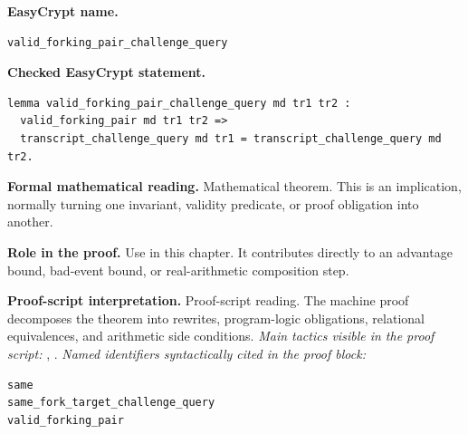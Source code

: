 \begin{formaltheorem}
\noindent\textbf{EasyCrypt name.}
\begin{lstlisting}[language=EasyCrypt,basicstyle=\ttfamily\scriptsize]
valid_forking_pair_challenge_query
\end{lstlisting}
\noindent\textbf{Checked EasyCrypt statement.}
\begin{lstlisting}[language=EasyCrypt,basicstyle=\ttfamily\scriptsize]
lemma valid_forking_pair_challenge_query md tr1 tr2 :
  valid_forking_pair md tr1 tr2 =>
  transcript_challenge_query md tr1 = transcript_challenge_query md tr2.
\end{lstlisting}
\noindent\textbf{Formal mathematical reading.}
Mathematical theorem. This is an implication, normally turning one invariant, validity predicate, or proof obligation into another.

\noindent\textbf{Role in the proof.}
Use in this chapter. It contributes directly to an advantage bound, bad-event bound, or real-arithmetic composition step.

\noindent\textbf{Proof-script interpretation.}
Proof-script reading. The machine proof decomposes the theorem into rewrites, program-logic obligations, relational equivalences, and arithmetic side conditions.
\emph{Main tactics visible in the proof script:} , .
\emph{Named identifiers syntactically cited in the proof block:}
\begin{lstlisting}[language=EasyCrypt,basicstyle=\ttfamily\scriptsize]
same
same_fork_target_challenge_query
valid_forking_pair
\end{lstlisting}

\end{formaltheorem}


